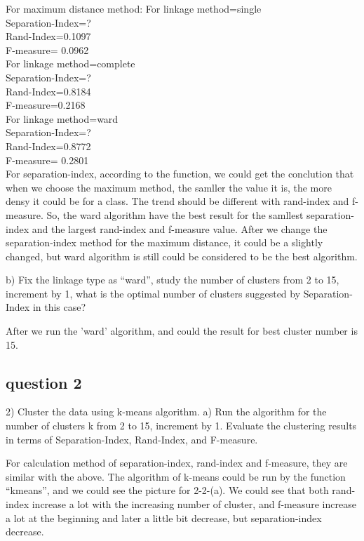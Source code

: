 \documentclass[]{article}
\begin{document}
For maximum distance method:
For linkage method=single\\
Separation-Index=? \\
Rand-Index=0.1097\\
F-measure= 0.0962\\
For linkage method=complete\\
Separation-Index=? \\
Rand-Index=0.8184 \\
F-measure=0.2168\\
For linkage method=ward\\
Separation-Index=? \\
Rand-Index=0.8772 \\
F-measure= 0.2801 \\


For separation-index, according to the function, we could get the conclution that when we choose the maximum method, the samller the value it is, the more densy it could be for a class. The trend should be different with rand-index and f-measure. So, the ward algorithm have the best result for the samllest separation-index and the largest rand-index and f-measure value. After we change the separation-index method for the maximum distance, it could be a slightly changed, but ward algorithm is still could be considered to be the best algorithm.

b) Fix the linkage type as “ward”, study the number of clusters from 2 to 15, increment by 1, what is the optimal number of clusters suggested by Separation- Index in this case?

After we run the 'ward' algorithm, and could the result for best cluster number is 15.

\subsection{question 2}
2) Cluster the data using k-means algorithm.
a) Run the algorithm for the number of clusters k from 2 to 15, increment by 1. Evaluate the clustering results in terms of Separation-Index, Rand-Index, and F-measure.

For calculation method of separation-index, rand-index and f-measure, they are similar with the above. The algorithm of k-means could be run by the function “kmeans”, and we could see the picture for 2-2-(a). We could see that both rand-index increase a lot with the increasing number of cluster, and f-measure increase a lot at the beginning and later a little bit decrease, but separation-index decrease.
\end{document}
